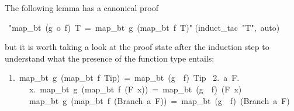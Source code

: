 \begin{isabelle}
\begin{isamarkuptext}
The following lemma has a canonical proof%
\end{isamarkuptext}%
\ {"}map\_bt\ (g\ o\ f)\ T\ =\ map\_bt\ g\ (map\_bt\ f\ T){"}\isanewline
{}(induct\_tac\ {"}T{"},\ auto)%
\begin{isamarkuptext}%
\noindent
but it is worth taking a look at the proof state after the induction step
to understand what the presence of the function type entails:
\begin{isabellepar}%
~1.~map\_bt~g~(map\_bt~f~Tip)~=~map\_bt~(g~{\isasymcirc}~f)~Tip\isanewline
~2.~{\isasymAnd}a~F.\isanewline
~~~~~~{\isasymforall}x.~map\_bt~g~(map\_bt~f~(F~x))~=~map\_bt~(g~{\isasymcirc}~f)~(F~x)~{\isasymLongrightarrow}\isanewline
~~~~~~map\_bt~g~(map\_bt~f~(Branch~a~F))~=~map\_bt~(g~{\isasymcirc}~f)~(Branch~a~F)%
\end{isabellepar}%
\end{isamarkuptext}%
\end{isabelle}%
